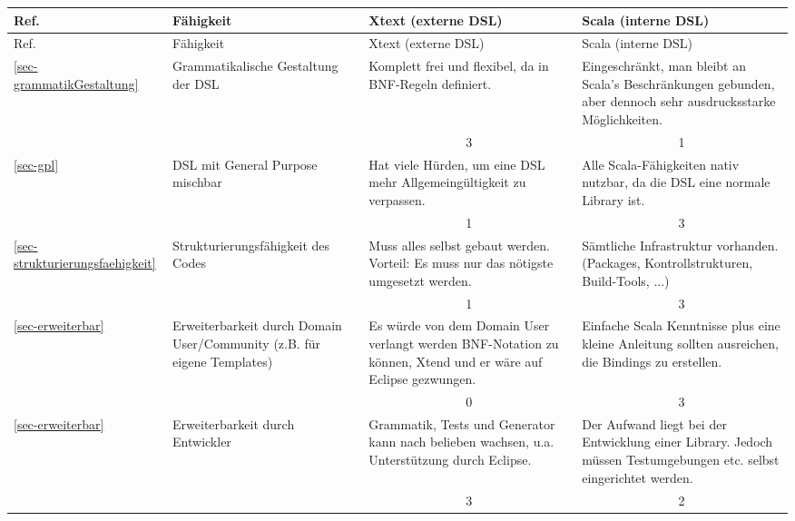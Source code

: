 \begin{landscape}
\begin{longtable}{|p{0.8cm}|p{4.4cm}|p{6.4cm}|p{6.4cm}|}

  \hline
  Ref. & Fähigkeit & Xtext (externe DSL) & Scala (interne DSL) \\ \hline \hline
  \endfirsthead

  \hline
  Ref. & Fähigkeit & Xtext (externe DSL) & Scala (interne DSL) \\ \hline
  \endhead


  \ref{sec-grammatikGestaltung}
  & Grammatikalische Gestaltung der DSL
  & Komplett frei und flexibel, da in BNF-Regeln definiert.
  & Eingeschränkt, man bleibt an Scala's Beschränkungen gebunden, aber
    dennoch sehr ausdrucksstarke Möglichkeiten.
  \\
  \cline{3-4}
  & & \multicolumn{1}{c|}{ 3 } & \multicolumn{1}{c|}{ 1 } \\ \hline

  \ref{sec-gpl}
  & DSL mit General Purpose mischbar
  & Hat viele Hürden, um eine DSL mehr Allgemeingültigkeit zu verpassen.
  & Alle Scala-Fähigkeiten nativ nutzbar, da die DSL eine normale Library ist.
  \\
  \cline{3-4}
  & & \multicolumn{1}{c|}{ 1 } & \multicolumn{1}{c|}{ 3 } \\ \hline

  \ref{sec-strukturierungsfaehigkeit}
  & Strukturierungsfähigkeit des Codes
  & Muss alles selbst gebaut werden. Vorteil: Es muss nur das nötigste
    umgesetzt werden.
  & Sämtliche Infrastruktur vorhanden. (Packages, Kontrollstrukturen,
    Build-Tools, ...)
  \\
  \cline{3-4}
  & & \multicolumn{1}{c|}{ 1 } & \multicolumn{1}{c|}{ 3 } \\ \hline

  \ref{sec-erweiterbar}
  & Erweiterbarkeit durch Domain User/Community (z.B. für eigene Templates)
  & Es würde von dem Domain User verlangt werden BNF-Notation zu können,
    Xtend und er wäre auf Eclipse gezwungen. %
  & Einfache Scala Kenntnisse plus eine kleine Anleitung sollten ausreichen,
    die Bindings zu erstellen.
  \\
  \cline{3-4}
  & & \multicolumn{1}{c|}{ 0 } & \multicolumn{1}{c|}{ 3 } \\ \hline

  \ref{sec-erweiterbar}
  & Erweiterbarkeit durch Entwickler
  & Grammatik, Tests und Generator kann nach belieben wachsen, u.a.
    Unterstützung durch Eclipse.
  & Der Aufwand liegt bei der Entwicklung einer Library. Jedoch müssen
    Testumgebungen etc. selbst eingerichtet werden.
  \\
  \cline{3-4}
  & & \multicolumn{1}{c|}{ 3 } & \multicolumn{1}{c|}{ 2 } \\ \hline


\end{longtable}
\end{landscape}
